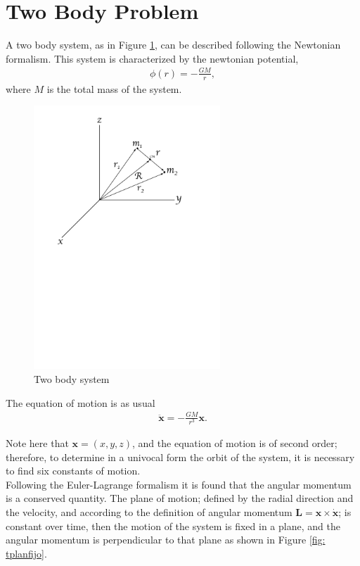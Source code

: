 \section{Two Body Problem}

A two body system, as in Figure \ref{fig: twobodysystem}, can be described following the Newtonian formalism. This system is characterized by the newtonian potential,
\begin{align}
	\phi (r) = -\frac{GM}{r},
\end{align}
where $M$ is the total mass of the system.
\begin{figure}[htb!]
\centering
\includegraphics[width=7cm]{../Tesis/Capitulo0/Figures/Coordenadas.pdf}
\caption{Two body system}
\label{fig: twobodysystem}
\end{figure}

The equation of motion is as usual
\begin{align}
	\ddot{\mathbf{x}} = -\frac{GM}{r^3} \mathbf{x}.
	\label{eq: newtonianeqmotion}
\end{align}

Note here that $\mathbf{x} = (x,y,z)$, and the equation of motion is of second order; therefore, to determine in a univocal form the orbit of the system, it is necessary to find six constants of motion.\\

Following the Euler-Lagrange formalism it is found that the angular momentum is a conserved quantity. The plane of motion; defined by the radial direction and the velocity, and according to the definition of angular momentum $\mathbf{L} = \mathbf{x} \times \dot{\mathbf{x}}$; is constant over time, then the motion of the system is fixed in a plane, and the angular momentum is perpendicular to that plane as shown in Figure \ref{fig: tplanfijo}.\\

